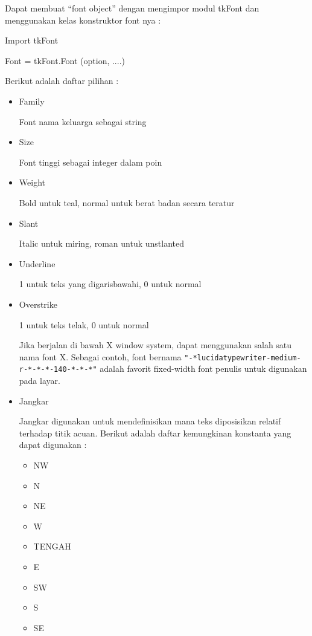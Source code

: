 \documentclass [12pt,a4paper,notitlepage,oneside,bahasa]{article}
\begin{document}
 		\par
\vspace{12pt}
Dapat membuat  ``font object'' dengan mengimpor modul tkFont dan menggunakan kelas konstruktor font nya : \par
Import tkFont \par
Font = tkFont.Font (option, ....) \par
\vspace{12pt}
Berikut adalah daftar pilihan : \par
\noindent 
\begin{itemize}
	\item Family \par
	Font nama keluarga sebagai string \par
	\noindent 
	\item Size \par
	Font tinggi sebagai integer dalam poin \par
	\noindent 
	\item Weight \par
	Bold untuk teal, normal untuk berat badan secara teratur \par
	\noindent 
	\item Slant \par
	Italic untuk miring, roman untuk unstlanted \par
	\noindent 
	\item Underline \par
	1 untuk teks yang digarisbawahi, 0 untuk normal \par
	\noindent 
	\item Overstrike \par
	1 untuk teks telak, 0 untuk normal \par
	Jika berjalan di bawah X window system, dapat menggunakan salah satu nama font X. Sebagai contoh, font bernama  \verb|"-*lucidatypewriter-medium-r-*-*-*-140-*-*-*"| adalah favorit fixed-width font penulis untuk digunakan pada layar. \par
	\noindent 
	\item Jangkar \par
	\noindent 
	Jangkar digunakan untuk mendefinisikan mana teks diposisikan relatif terhadap titik acuan. Berikut adalah daftar kemungkinan konstanta yang dapat digunakan :
	\noindent
	\begin{itemize}
		\item NW  
		\item N
		\item NE
		\item W
		\item TENGAH
		\item E
		\item SW
		\item S
		\item SE
	\end{itemize}
\end{itemize}
\end{document}
